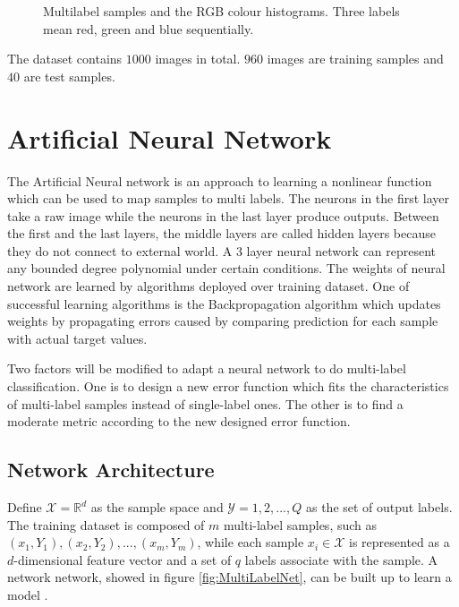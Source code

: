 \begin{figure}[!htb]
\caption{Multilabel samples and the RGB colour histograms. Three labels mean red, green and blue sequentially. }
\end{figure}

The dataset contains $1000$ images in total. $960$ images are training samples and $40$ are test samples. 

\section{Artificial Neural Network}

The Artificial Neural network is an approach to learning a nonlinear function which can be used to map samples to multi labels. The neurons in the first layer take a raw image while the neurons in the last layer produce outputs. Between the first and the last layers, the middle layers are called hidden layers because they do not connect to external world. A 3 layer neural network can represent any bounded degree polynomial under certain conditions\citep{barron1993universal}. The weights of neural network are learned by algorithms deployed over training dataset. One of successful learning algorithms is the Backpropagation algorithm which updates weights by propagating errors caused by comparing prediction for each sample with actual target values.

Two factors will be modified to adapt a neural network to do multi-label classification. One is to design a new error function which fits the characteristics of multi-label samples instead of single-label ones. The other is to find a moderate metric according to the new designed error function.

\subsection{Network Architecture}

Define $\mathcal{X} = \mathbb{R}^{d}$ as the sample space and $\mathcal{Y} = {1,2,...,Q}$ as the set of output labels. The training dataset is composed of $m$ multi-label samples, such as ${(x_{1}, Y_{1}),(x_{2}, Y_{2}),...,(x_{m}, Y_{m})}$, while each sample $x_{i} \in \mathcal{X}$ is represented as a $d$-dimensional feature vector and a set of $q$ labels associate with the sample. A network network, showed in figure \ref{fig:MultiLabelNet}, can be built up to learn a model .

